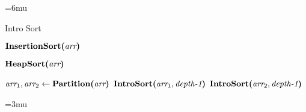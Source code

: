 \begin{algorithm}[H]
	\unboldmath
	\thinmuskip=6mu
	\caption{Intro Sort}
	\begin{algorithmic}[1]
		
		\State
		 
			\State $\textbf{InsertionSort(}\textit{arr}\textbf{)}$
		
		\State
		 
		\State $\textbf{HeapSort(}\textit{arr}\textbf{)}$
		
		\State
		\Else {}
			\State $\textit{arr}_1, \textit{arr}_2 \gets \textbf{Partition(}\textit{arr}\textbf{)}$
			\State $\textbf{IntroSort(}\textit{arr}_1, \textit{depth-1}\textbf{)}$
			\State $\textbf{IntroSort(}\textit{arr}_2, \textit{depth-1}\textbf{)}$
		\EndIf
		
		\State
		\EndProcedure
	\end{algorithmic}
	\boldmath
	\thinmuskip=3mu
	\label{pseudocode:intro-sort}
\end{algorithm}
